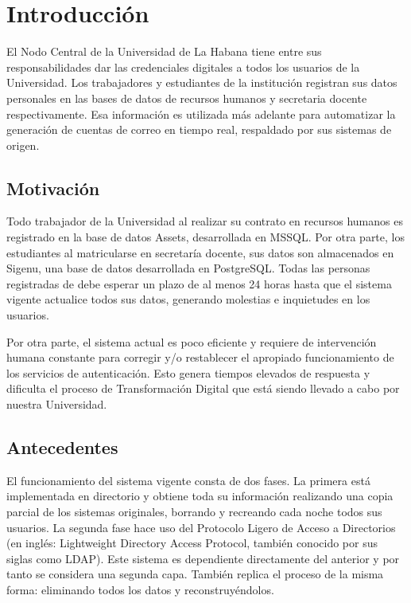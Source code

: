 \chapter*{Introducción}\label{chapter:introduction}
El Nodo Central de la Universidad de La Habana tiene entre sus responsabilidades dar  las credenciales  digitales a todos los usuarios de la Universidad. Los trabajadores y estudiantes de la instituci\'on registran sus datos personales en las bases de datos de recursos humanos y secretaria docente respectivamente. Esa informaci\'on  es utilizada m\'as adelante para automatizar la generación de cuentas de correo en tiempo real, respaldado por sus sistemas de origen.


\section*{Motivación}
Todo trabajador de la Universidad al realizar su contrato en recursos humanos es registrado en la base de datos Assets, desarrollada en MSSQL. Por otra parte, los estudiantes al matricularse en secretaría docente, sus datos son almacenados en Sigenu, una base de datos desarrollada en PostgreSQL. Todas las personas registradas de debe esperar un plazo de al menos 24 horas hasta que el sistema vigente actualice todos sus datos, generando molestias e inquietudes en los usuarios.

Por otra parte, el sistema actual es poco eficiente y requiere de intervención humana constante para corregir y/o restablecer el apropiado funcionamiento de los servicios de autenticación. Esto genera tiempos elevados de respuesta y dificulta el proceso de Transformación Digital que está siendo llevado a cabo por nuestra Universidad.

\section*{Antecedentes}
El funcionamiento del sistema vigente consta de dos fases. La primera está implementada en directorio y obtiene toda su información realizando una copia parcial de los sistemas originales, borrando y recreando cada noche todos sus usuarios. La segunda fase hace uso del Protocolo Ligero de Acceso a Directorios (en inglés: Lightweight Directory Access Protocol, también conocido por sus siglas como LDAP). Este sistema es dependiente directamente del anterior y por tanto se considera una segunda capa. También replica el proceso de la misma forma: eliminando todos los datos y reconstruyéndolos. 
